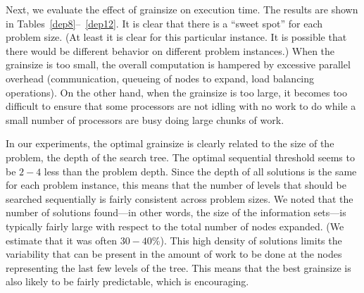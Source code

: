 \documentclass[times, 10pt,twocolumn]{article}
\begin{document}
Next, we evaluate the effect of grainsize on execution time.  The results are
shown in Tables~\ref{dep8}--~\ref{dep12}.  It is clear that there is a ``sweet
spot'' for each problem size.  (At least it is clear for this particular
instance.  It is possible that there would be different behavior on different
problem instances.)  When the grainsize is too small, the overall computation
is hampered by excessive parallel overhead (communication, queueing of nodes to
expand, load balancing operations).  On the other hand, when the grainsize is
too large, it becomes too difficult to ensure that some processors are not
idling with no work to do while a small number of processors are busy doing
large chunks of work.  

In our experiments, the optimal grainsize is clearly related to the size of the
problem, the depth of the search tree.  The optimal sequential threshold seems
to be $2-4$ less than the problem depth.  Since the depth of all solutions is
the same for each problem instance, this means that the number of levels that
should be searched sequentially is fairly consistent across problem sizes.  We
noted that the number of solutions found---in other words, the size of the
information sets---is typically fairly large with respect to the total number
of nodes expanded.  (We estimate that it was often $30-40\%$).  This high
density of solutions limits the variability that can be present in the amount
of work to be done at the nodes representing the last few levels of the tree.
This means that the best grainsize is also likely to be fairly predictable,
which is encouraging.  
\end{document}
